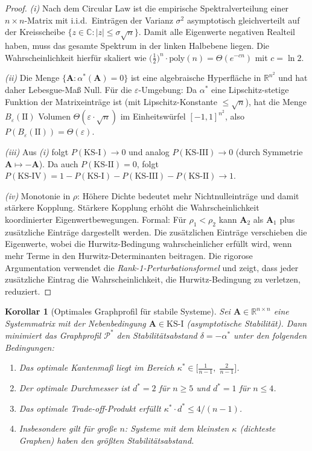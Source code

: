 ﻿\documentclass[12pt, a4paper, titlepage]{report}
\newtheorem{corollary}[theorem]{Korollar}
\theoremstyle{definition}
\theoremstyle{remark}
\newcommand{\R}{\mathbb{R}}
\newcommand{\C}{\mathbb{C}}
\newcommand{\vA}{\bm{A}}
\newcommand{\KS}{\mathrm{KS}}
\begin{document}
\begin{proof}
\textit{(i)} Nach dem Circular Law ist die empirische Spektralverteilung einer
$n \times n$-Matrix mit i.i.d.\ Einträgen der Varianz $\sigma^2$ asymptotisch
gleichverteilt auf der Kreisscheibe $\{z \in \C : |z| \leq \sigma\sqrt{n}\}$.
Damit alle Eigenwerte negativen Realteil haben, muss das gesamte Spektrum in der
linken Halbebene liegen. Die Wahrscheinlichkeit hierfür skaliert wie
$\bigl(\frac{1}{2}\bigr)^n \cdot \mathrm{poly}(n) = \Theta(e^{-cn})$ mit
$c = \ln 2$.

\textit{(ii)} Die Menge $\{\vA : \alpha^*(\vA) = 0\}$ ist eine algebraische
Hyperfläche in $\R^{n^2}$ und hat daher Lebesgue-Maß Null. Für die
$\varepsilon$-Umgebung: Da $\alpha^*$ eine Lipschitz-stetige Funktion der
Matrixeinträge ist (mit Lipschitz-Konstante $\leq \sqrt{n}$), hat die Menge
$B_\varepsilon(\mathrm{II})$ Volumen $\Theta(\varepsilon \cdot \sqrt{n})$
im Einheitswürfel $[-1,1]^{n^2}$, also
$P(B_\varepsilon(\mathrm{II})) = \Theta(\varepsilon)$.

\textit{(iii)} Aus \textit{(i)} folgt $P(\KS\text{-I}) \to 0$ und analog
$P(\KS\text{-III}) \to 0$ (durch Symmetrie $\vA \mapsto -\vA$). Da auch
$P(\KS\text{-II}) = 0$, folgt $P(\KS\text{-IV}) = 1 - P(\KS\text{-I}) -
P(\KS\text{-III}) - P(\KS\text{-II}) \to 1$.

\textit{(iv)} Monotonie in $\rho$: Höhere Dichte bedeutet mehr Nichtnulleinträge
und damit stärkere Kopplung. Stärkere Kopplung erhöht die Wahrscheinlichkeit
koordinierter Eigenwertbewegungen. Formal: Für $\rho_1 < \rho_2$ kann $\vA_2$ als
$\vA_1$ plus zusätzliche Einträge dargestellt werden. Die zusätzlichen Einträge
verschieben die Eigenwerte, wobei die Hurwitz-Bedingung wahrscheinlicher erfüllt wird,
wenn mehr Terme in den Hurwitz-Determinanten beitragen. Die rigorose Argumentation
verwendet die \emph{Rank-1-Perturbationsformel} und zeigt, dass jeder zusätzliche
Eintrag die Wahrscheinlichkeit, die Hurwitz-Bedingung zu verletzen, reduziert.
\end{proof}

\begin{corollary}[Optimales Graphprofil für stabile Systeme]
\label{cor:opt_stabil}
Sei $\vA \in \R^{n \times n}$ eine Systemmatrix mit der Nebenbedingung
$\vA \in \KS\text{-I}$ (asymptotische Stabilität). Dann minimiert das Graphprofil
$\mathcal{P}^*$ den Stabilitätsabstand $\delta = -\alpha^*$ unter den folgenden
Bedingungen:
\begin{enumerate}[label=(\roman*)]
  \item Das optimale Kantenmaß liegt im Bereich
    $\kappa^* \in \bigl[\frac{1}{n-1},\; \frac{2}{n-1}\bigr]$.
  \item Der optimale Durchmesser ist $d^* = 2$ für $n \geq 5$ und $d^* = 1$
    für $n \leq 4$.
  \item Das optimale Trade-off-Produkt erfüllt
    $\kappa^* \cdot d^* \leq 4/(n-1)$.
  \item Insbesondere gilt für große $n$: Systeme mit dem kleinsten $\kappa$ (dichteste
    Graphen) haben den größten Stabilitätsabstand.
\end{enumerate}
\end{corollary}
\end{document}
